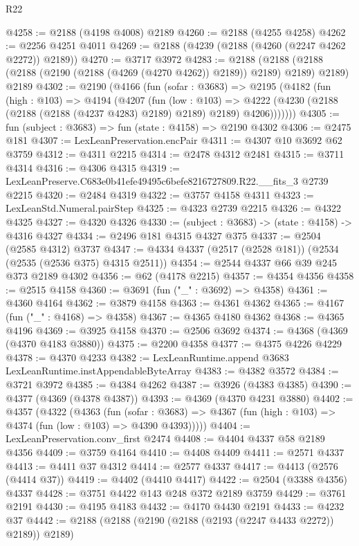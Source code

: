 \begin{lexlean}{R22}
\begin{coremodule}
@4258 := @2188 (@4198 @4008) @2189
@4260 := @2188 (@4255 @4258)
@4262 := @2256 @4251 @4011
@4269 := @2188 (@4239 (@2188 (@4260 (@2247 @4262 @2272)) @2189))
@4270 := @3717 @3972
@4283 := @2188
    (@2188 (@2188 (@2188 (@2190 (@2188 (@4269 (@4270 @4262)) @2189)) @2189) @2189) @2189)
    @2189
@4302 := @2190
    (@4166
      (fun (sofar : @3683) =>
      @2195
        (@4182
          (fun (high : @103) =>
          @4194
            (@4207
              (fun (low : @103) =>
              @4222 (@4230 (@2188 (@2188 (@2188 (@4237 @4283) @2189) @2189) @2189) @4206)))))))
@4305 := fun (subject : @3683) => fun (state : @4158) => @2190 @4302
@4306 := @2475 @181
@4307 := LexLeanPreservation.encPair
@4311 := @4307 @10 @3692 @62 @3759
@4312 := @4311 @2215
@4314 := @2478 @4312 @2481
@4315 := @3711 @4314
@4316 := @4306 @4315
@4319 := LexLeanPreserve.C683e0b41efe49495c6befe8216727809.R22.__fits_3 @2739 @2215
@4320 := @2484 @4319
@4322 := @3757 @4158 @4311
@4323 := LexLeanStd.Numeral.pairStep
@4325 := @4323 @2739 @2215
@4326 := @4322 @4325
@4327 := @4320 @4326
@4330 := (subject : @3683) -> (state : @4158) -> @4316 @4327
@4334 := @2496 @181 @4315 @4327 @375
@4337 := @2504 (@2585 @4312) @3737
@4347 := @4334 @4337 (@2517 (@2528 @181)) (@2534 (@2535 (@2536 @375) @4315 @2511))
@4354 := @2544 @4337 @66 @39 @245 @373 @2189 @4302
@4356 := @62 (@4178 @2215)
@4357 := @4354 @4356
@4358 := @2515 @4158
@4360 := @3691 (fun ("_" : @3692) => @4358)
@4361 := @4360 @4164
@4362 := @3879 @4158
@4363 := @4361 @4362
@4365 := @4167 (fun ("_" : @4168) => @4358)
@4367 := @4365 @4180 @4362
@4368 := @4365 @4196
@4369 := @3925 @4158
@4370 := @2506 @3692
@4374 := @4368 (@4369 (@4370 @4183 @3880))
@4375 := @2200 @4358
@4377 := @4375 @4226 @4229
@4378 := @4370 @4233
@4382 := LexLeanRuntime.append @3683 LexLeanRuntime.instAppendableByteArray
@4383 := @4382 @3572
@4384 := @3721 @3972
@4385 := @4384 @4262
@4387 := @3926 (@4383 @4385)
@4390 := @4377 (@4369 (@4378 @4387))
@4393 := @4369 (@4370 @4231 @3880)
@4402 := @4357
    (@4322
      (@4363
        (fun (sofar : @3683) =>
        @4367 (fun (high : @103) => @4374 (fun (low : @103) => @4390 @4393)))))
@4404 := LexLeanPreservation.conv_first @2474
@4408 := @4404 @4337 @58 @2189 @4356
@4409 := @3759 @4164
@4410 := @4408 @4409
@4411 := @2571 @4337
@4413 := @4411 @37 @4312
@4414 := @2577 @4337
@4417 := @4413 (@2576 (@4414 @37))
@4419 := @4402 (@4410 @4417)
@4422 := @2504 (@3388 @4356) @4337
@4428 := @3751 @4422 @143 @248 @372 @2189 @3759
@4429 := @3761 @2191
@4430 := @4195 @4183
@4432 := @4170 @4430 @2191
@4433 := @4232 @37
@4442 := @2188 (@2188 (@2190 (@2188 (@2193 (@2247 @4433 @2272)) @2189)) @2189)

\end{coremodule}
\end{lexlean}
